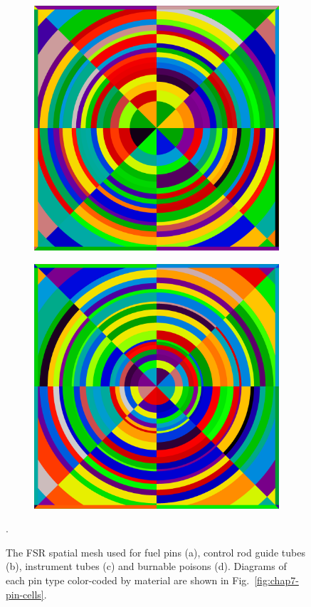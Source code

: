 \begin{figure}[hb!]
\begin{subfigure}{.5\textwidth}
  \centering
  \includegraphics[width=0.8\linewidth]{figures/quantification/fsrs/fsrs-instr-tube}
  \caption{}
  \label{fig:chap8-instr-tube}
\end{subfigure}%
\begin{subfigure}{.5\textwidth}
  \centering
  \includegraphics[width=0.8\linewidth]{figures/quantification/fsrs/fsrs-bp}
  \caption{}
  \label{fig:chap8-bp}
\end{subfigure}%
\caption[FSR discretization meshes applied to BEAVRS pin cells]{The \ac{FSR} spatial mesh used for fuel pins (a), control rod guide tubes (b), instrument tubes (c) and burnable poisons (d). Diagrams of each pin type color-coded by material are shown in Fig.~\ref{fig:chap7-pin-cells}.}.
\label{fig:chap8-pin-cell-fsrs}
\end{figure}


